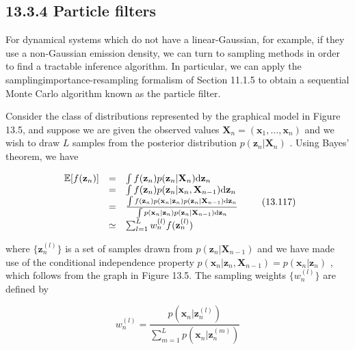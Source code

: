 \documentclass[
  10
]{article}
\begin{document}
\subsection{13.3.4 Particle filters}\label{particle-filters}

For dynamical systems which do not have a linear-Gaussian, for example,
if they use a non-Gaussian emission density, we can turn to sampling
methods in order to find a tractable inference algorithm. In particular,
we can apply the samplingimportance-resampling formalism of Section
11.1.5 to obtain a sequential Monte Carlo algorithm known as the
particle filter.

Consider the class of distributions represented by the graphical model
in Figure 13.5, and suppose we are given the observed values
\(\mathbf { X } _ { n } = \left( \mathbf { x } _ { 1 } , \ldots , \mathbf { x } _ { n } \right)\)
and we wish to draw \(L\) samples from the posterior distribution
\(p ( \mathbf { z } _ { n } | \mathbf { X } _ { n } )\) . Using Bayes'
theorem, we have

\[
\begin{array}{r c l} \mathbb {E} [ f (\mathbf {z} _ {n}) ] & = & \int f (\mathbf {z} _ {n}) p (\mathbf {z} _ {n} | \mathbf {X} _ {n})   \mathrm{d} \mathbf {z} _ {n} \\ & = & \int f (\mathbf {z} _ {n}) p (\mathbf {z} _ {n} | \mathbf {x} _ {n}, \mathbf {X} _ {n - 1})   \mathrm{d} \mathbf {z} _ {n} \\ & = & \frac {\int f (\mathbf {z} _ {n}) p (\mathbf {x} _ {n} | \mathbf {z} _ {n}) p (\mathbf {z} _ {n} | \mathbf {X} _ {n - 1})   \mathrm{d} \mathbf {z} _ {n}}{\int p (\mathbf {x} _ {n} | \mathbf {z} _ {n}) p (\mathbf {z} _ {n} | \mathbf {X} _ {n - 1})   \mathrm{d} \mathbf {z} _ {n}} \\ & \simeq & \sum_ {l = 1} ^ {L} w _ {n} ^ {(l)} f (\mathbf {z} _ {n} ^ {(l)}) \end{array}\tag{13.117}
\]

where \(\{ \mathbf { z } _ { n } ^ { ( l ) } \}\) is a set of samples
drawn from \(p ( \mathbf { z } _ { n } | \mathbf { X } _ { n - 1 } )\)
and we have made use of the conditional independence property
\(p ( \mathbf { x } _ { n } | \mathbf { z } _ { n } , \mathbf { X } _ { n - 1 } ) = p ( \mathbf { x } _ { n } | \mathbf { z } _ { n } )\)
, which follows from the graph in Figure 13.5. The sampling weights
\(\{ w _ { n } ^ { ( l ) } \}\) are defined by

\[
w _ {n} ^ {(l)} = \frac {p (\mathbf {x} _ {n} | \mathbf {z} _ {n} ^ {(l)})}{\sum_ {m = 1} ^ {L} p (\mathbf {x} _ {n} | \mathbf {z} _ {n} ^ {(m)})}\tag{13.118}
\]
\end{document}
